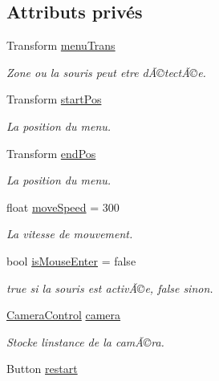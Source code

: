 \subsection*{Attributs privés}
\begin{DoxyCompactItemize}
\item 
Transform \mbox{\hyperlink{class_menu_visualization_u_i_a491555371450cb31cfb730f16ab5a0bd}{menu\+Trans}}
\begin{DoxyCompactList}\small\item\em Zone ou la souris peut etre dÃ©tectÃ©e. \end{DoxyCompactList}\item 
Transform \mbox{\hyperlink{class_menu_visualization_u_i_afd585b84497729b656706b4f163defe1}{start\+Pos}}
\begin{DoxyCompactList}\small\item\em La position du menu. \end{DoxyCompactList}\item 
Transform \mbox{\hyperlink{class_menu_visualization_u_i_aca26bc81a47e95274e282b0688d48ab0}{end\+Pos}}
\begin{DoxyCompactList}\small\item\em La position du menu. \end{DoxyCompactList}\item 
float \mbox{\hyperlink{class_menu_visualization_u_i_a13e28cb9219cab1e48b80d75be689603}{move\+Speed}} = 300
\begin{DoxyCompactList}\small\item\em La vitesse de mouvement. \end{DoxyCompactList}\item 
bool \mbox{\hyperlink{class_menu_visualization_u_i_abd99e9bed58deeed6f8cd1c329dbe100}{is\+Mouse\+Enter}} = false
\begin{DoxyCompactList}\small\item\em true si la souris est activÃ©e, false sinon. \end{DoxyCompactList}\item 
\mbox{\hyperlink{class_camera_control}{Camera\+Control}} \mbox{\hyperlink{class_menu_visualization_u_i_acbeec950a81f60bf3cd493d9e4a99896}{camera}}
\begin{DoxyCompactList}\small\item\em Stocke l\textquotesingle{}instance de la camÃ©ra. \end{DoxyCompactList}\item 
Button \mbox{\hyperlink{class_menu_visualization_u_i_ab14033508bbd734ad84b841cccbbdbaa}{restart}}

\end{DoxyCompactItemize}
